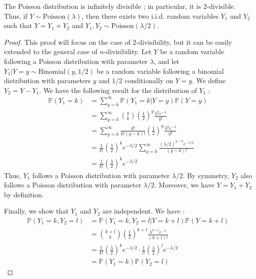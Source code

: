 \begin{proposition}
    The Poisson distribution is infinitely divisible ; in particular, it is $2$-divisible. Thus, if $Y \sim \text{Poisson}(\lambda)$, then there exists two i.i.d. random variables $Y_1$ and $Y_2$ such that $Y = Y_1 + Y_2$ and $Y_1, Y_2 \sim \text{Poisson}(\lambda/2)$.
\end{proposition}

\begin{proof}
    This proof will focus on the case of $2$-divisibility, but it can be easily extended to the general case of $n$-divisibility.
    Let $Y$ be a random variable following a Poisson distribution with parameter $\lambda$, and let $Y_1 | Y=y \sim \text{Binomial}(y, 1/2)$ be a random variable following a binomial distribution with parameters $y$ and $1/2$ conditionally on $Y=y$. We define $Y_2 = Y - Y_1$. We have the following result for the distribution of $Y_1$ :
    \begin{align*}
        \mathbb{P}(Y_1 = k) &= \sum_{y=k}^{\infty} \mathbb{P}(Y_1 = k | Y = y) \mathbb{P}(Y = y) \\
        &= \sum_{y=k}^{\infty} \binom{y}{k} \left( \frac{1}{2} \right)^y \frac{\lambda^y e^{-\lambda}}{y!} \\
        &= \sum_{y=k}^{\infty} \frac{y!}{k!(y-k)!} \left( \frac{1}{2} \right)^y \frac{\lambda^y e^{-\lambda}}{y!} \\
        &= \frac{1}{k!} \left( \frac{\lambda}{2} \right)^k e^{-\lambda/2} \sum_{y=k}^{\infty} \frac{(\lambda/2)^{y-k} e^{-\lambda/2}}{(y-k)!} \\
        &= \frac{1}{k!} \left( \frac{\lambda}{2} \right)^k e^{-\lambda/2}
    \end{align*}
    Thus, $Y_1$ follows a Poisson distribution with parameter $\lambda/2$. By symmetry, $Y_2$ also follows a Poisson distribution with parameter $\lambda/2$. Moreover, we have $Y = Y_1 + Y_2$ by definition.

    Finally, we show that $Y_1$ and $Y_2$ are independent. We have :
    \begin{align*}
        \mathbb{P}(Y_1 = k, Y_2 = l) &= \mathbb{P}(Y_1 = k, Y_2 = l | Y = k + l) \mathbb{P}(Y = k + l) \\
        &= \binom{k+l}{k} \left( \frac{1}{2} \right)^{k+l} \frac{\lambda^{k+l} e^{-\lambda}}{(k+l)!} \\
        &= \frac{1}{k!} \left( \frac{\lambda}{2} \right)^k e^{-\lambda/2} \cdot \frac{1}{l!} \left( \frac{\lambda}{2} \right)^l e^{-\lambda/2} \\
        &= \mathbb{P}(Y_1 = k) \mathbb{P}(Y_2 = l)
    \end{align*}
\end{proof}

